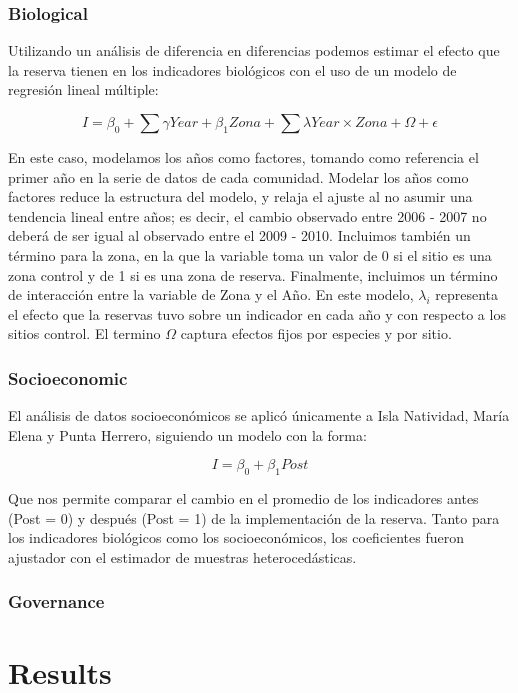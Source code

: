 \documentclass{frontiersSCNS}
\begin{document}
\subsubsection{Biological}\label{biological}

Utilizando un análisis de diferencia en diferencias podemos estimar el
efecto que la reserva tienen en los indicadores biológicos
\citep{moland_2013-VP} con el uso de un modelo de regresión lineal
múltiple:

\[I = \beta_0 + \sum \gamma Year + \beta_1 Zona + \sum \lambda Year\times Zona + \Omega + \epsilon\]

En este caso, modelamos los años como factores, tomando como referencia
el primer año en la serie de datos de cada comunidad. Modelar los años
como factores reduce la estructura del modelo, y relaja el ajuste al no
asumir una tendencia lineal entre años; es decir, el cambio observado
entre 2006 - 2007 no deberá de ser igual al observado entre el 2009 -
2010. Incluimos también un término para la zona, en la que la variable
toma un valor de 0 si el sitio es una zona control y de 1 si es una zona
de reserva. Finalmente, incluimos un término de interacción entre la
variable de Zona y el Año. En este modelo, \(\lambda_i\) representa el
efecto que la reservas tuvo sobre un indicador en cada año y con
respecto a los sitios control. El termino \(\Omega\) captura efectos
fijos por especies y por sitio.

\subsubsection{Socioeconomic}\label{socioeconomic}

El análisis de datos socioeconómicos se aplicó únicamente a Isla
Natividad, María Elena y Punta Herrero, siguiendo un modelo con la
forma:

\[I = \beta_0 + \beta_1Post\]

Que nos permite comparar el cambio en el promedio de los indicadores
antes (Post = 0) y después (Post = 1) de la implementación de la
reserva. Tanto para los indicadores biológicos como los socioeconómicos,
los coeficientes fueron ajustador con el estimador de muestras
heterocedásticas.

\subsubsection{Governance}\label{governance}

\section{Results}\label{results}
\end{document}
